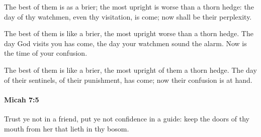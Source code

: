 			\begin{versebox}
					\item[BHS] 
					\item[LXX] 
					\item[ASV] The best of them is as a brier; the most upright is worse than a thorn hedge: the day of thy watchmen, even thy visitation, is come; now shall be their perplexity.
					\item[NIV] The best of them is like a brier, the most upright worse than a thorn hedge. The day God visits you has come, the day your watchmen sound the alarm. Now is the time of your confusion.
					\item[NRSV] The best of them is like a brier, the most upright of them a thorn hedge. The day of their sentinels, of their punishment, has come; now their confusion is at hand.
			\end{versebox}

		\paragraph{Micah 7:5} %
			\label{MICAH-7-5}

			Trust ye not in a friend, put ye not confidence in a guide: keep the doors of thy mouth from her that lieth in thy bosom.

